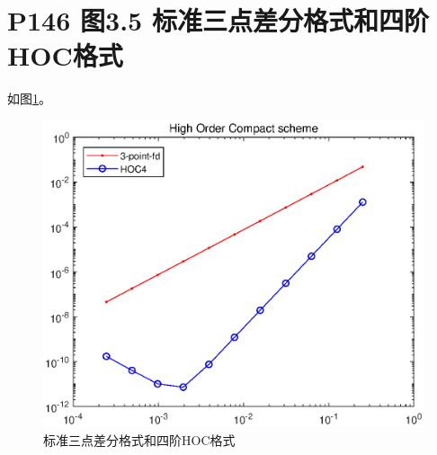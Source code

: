 \documentclass{article}%
\begin{document}
\newpage

\section{P146 图3.5 标准三点差分格式和四阶HOC格式}

如图\ref{Fig:2.1}。

\begin{figure}[H]
	\includegraphics[width=1\linewidth]{week9_2_1.eps}
	\caption{标准三点差分格式和四阶HOC格式}
	\label{Fig:2.1}
\end{figure}
\end{document}
